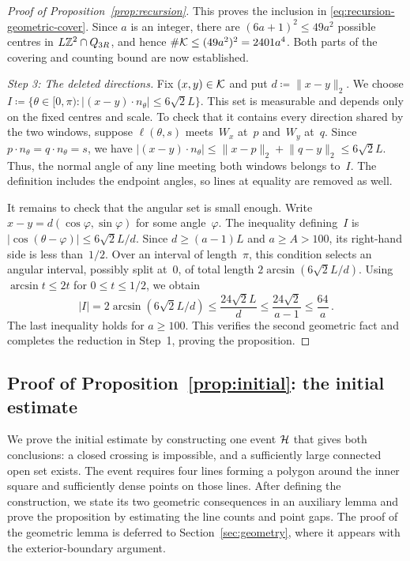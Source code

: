 \documentclass[11pt,letterpaper]{article}
\begin{document}
\begin{proof}[Proof of Proposition~\ref{prop:recursion}]
This proves the inclusion in \eqref{eq:recursion-geometric-cover}. Since $a$ is an integer, there are $(6a+1)^2\le49a^2$ possible centres in $L\mathbb Z^2\cap Q_{3R}$, and hence $\#\mathcal K\le(49a^2)^2=2401a^4$. Both parts of the covering and counting bound are now established.

\emph{Step 3: The deleted directions.} Fix $(x,y)\in\mathcal K$ and put $d\coloneqq\lVert x-y\rVert_2$. We choose $I\coloneqq\{\theta\in[0,\pi)\colon\lvert(x-y)\cdot n_\theta\rvert\le6\sqrt2L\}$. This set is measurable and depends only on the fixed centres and scale. To check that it contains every direction shared by the two windows, suppose $\ell(\theta,s)$ meets~$W_x$ at~$p$ and~$W_y$ at~$q$. Since $p\cdot n_\theta=q\cdot n_\theta=s$, we have $\lvert(x-y)\cdot n_\theta\rvert\le\lVert x-p\rVert_2+\lVert q-y\rVert_2\le6\sqrt2L$. Thus, the normal angle of any line meeting both windows belongs to~$I$. The definition includes the endpoint angles, so lines at equality are removed as well.

It remains to check that the angular set is small enough. Write $x-y=d(\cos\varphi,\sin\varphi)$ for some angle~$\varphi$. The inequality defining~$I$ is $\lvert\cos(\theta-\varphi)\rvert\le6\sqrt2L/d$. Since $d\ge(a-1)L$ and $a\ge A>100$, its right-hand side is less than~$1/2$. Over an interval of length~$\pi$, this condition selects an angular interval, possibly split at~$0$, of total length $2\arcsin(6\sqrt2L/d)$. Using $\arcsin t\le2t$ for $0\le t\le1/2$, we obtain
\begin{equation}\label{eq:recursion-angular-bound}
  \lvert I\rvert=2\arcsin(6\sqrt2L/d)\le\frac{24\sqrt2L}{d}\le\frac{24\sqrt2}{a-1}\le\frac{64}{a}\,.
\end{equation}
The last inequality holds for $a\ge100$. This verifies the second geometric fact and completes the reduction in Step~1, proving the proposition.
\end{proof}

\subsection{Proof of \texorpdfstring{Proposition~\ref{prop:initial}}{the initial estimate}: the initial estimate}
\label{sec:initial}

We prove the initial estimate by constructing one event $\mathcal H$ that gives both conclusions: a closed crossing is impossible, and a sufficiently large connected open set exists. The event requires four lines forming a polygon around the inner square and sufficiently dense points on those lines. After defining the construction, we state its two geometric consequences in an auxiliary lemma and prove the proposition by estimating the line counts and point gaps. The proof of the geometric lemma is deferred to Section~\ref{sec:geometry}, where it appears with the exterior-boundary argument.
\end{document}
